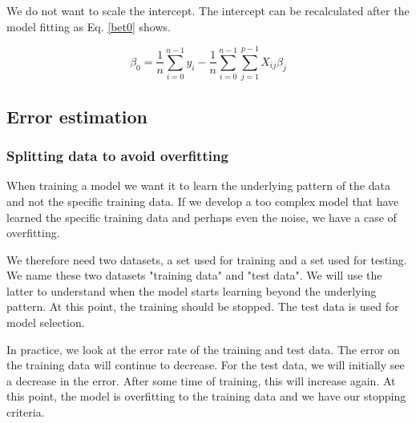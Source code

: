 We do not want to scale the intercept.  The intercept can be recalculated after the model fitting as Eq. \ref{bet0} shows.

\begin{equation}\label{bet0}
    \beta_0 = \frac{1}{n}\sum_{i=0}^{n-1}y_i - \frac{1}{n}\sum_{i=0}^{n-1}\sum_{j=1}^{p-1}X_{ij}\beta_j
\end{equation}

\subsection{Error estimation}

\subsubsection{Splitting data to avoid overfitting}\label{overfitting}

When training a model we want it to learn the underlying pattern of the data and not the specific training data. If we develop a too complex model that have learned the specific training data and perhaps even the noise, we have a case of overfitting. 

We therefore need two datasets, a set used for training and a set used for testing. We name these two datasets "training data" and "test data". 
We will use the latter to understand when the model starts learning beyond the underlying pattern. At this point, the training should be stopped. The test data is used for model selection.

In practice, we look at the error rate of the training and test data. The error on the training data will continue to decrease. For the test data, we will initially see a decrease in the error. After some time of training, this will increase again. At this point, the model is overfitting to the training data and we have our stopping criteria.


